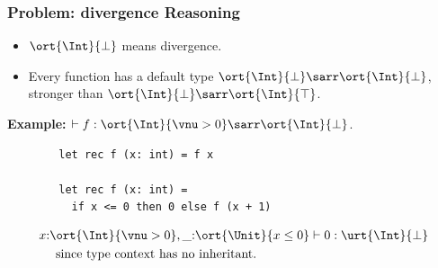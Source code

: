 

\begin{frame}[fragile]
    \frametitle{Problem: divergence Reasoning}
    
    \begin{itemize}
        \item $\ort{\Int}{\bot}$ means divergence. 
        \item Every function has a default type $\ort{\Int}{\bot} \sarr \ort{\Int}{\bot}$, stronger than $\ort{\Int}{\bot} \sarr \ort{\Int}{\top}$.
    \end{itemize}

    \textbf{Example:} $\vdash f : \ort{\Int}{\vnu > 0} \sarr \ort{\Int}{\bot}$.
    \begin{verbatim}
        let rec f (x: int) = f x

        let rec f (x: int) = 
          if x <= 0 then 0 else f (x + 1)
    \end{verbatim}
    \begin{align*}
        &x{:}\ort{\Int}{\vnu > 0}, \_{:}\ort{\Unit}{x \leq 0} \vdash 0 : \urt{\Int}{\bot} 
        \\&\quad \text{ since type context has no inheritant. }
    \end{align*}
    
\end{frame}
